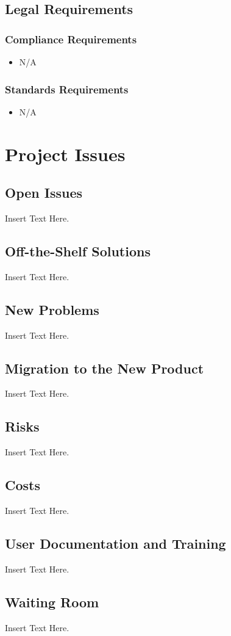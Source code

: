 \documentclass [12pt]{article}
\begin{document}
\subsection{Legal Requirements}
\subsubsection{Compliance Requirements }
	\begin{itemize}
		\item N/A
	\end{itemize}
	
\subsubsection{Standards Requirements }
	\begin{itemize}
		\item N/A
	\end{itemize}



\section {Project Issues} 


\subsection{Open Issues}
	Insert Text Here.

\subsection{Off-the-Shelf Solutions}
	Insert Text Here.

\subsection{New Problems}
	Insert Text Here.

\subsection{Migration to the New Product} 
	Insert Text Here.

\subsection{Risks}
	Insert Text Here.
	
\subsection{Costs}	
	Insert Text Here.

\subsection{User Documentation and Training}
	Insert Text Here.

\subsection{Waiting Room}
	Insert Text Here. 
\end{document}
